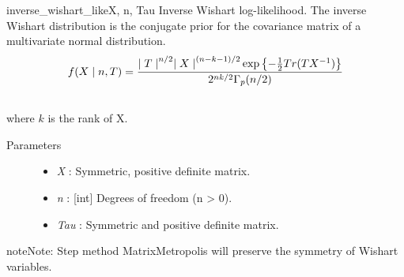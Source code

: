 \hypertarget{pymc.distributions.inverse_wishart_like}{}\begin{funcdesc}{inverse\_wishart\_like}{X, n, Tau}
Inverse Wishart log-likelihood. The inverse Wishart distribution is the conjugate
prior for the covariance matrix of a multivariate normal distribution.
\begin{gather}
\begin{split}f(X \mid n, T) = \frac{{\mid T \mid}^{n/2}{\mid X \mid}^{(n-k-1)/2} \exp\left\{ -\frac{1}{2} Tr(TX^{-1}) \right\}}{2^{nk/2} \Gamma_p(n/2)}\end{split}\notag\\\begin{split}\end{split}\notag
\end{gather}
where $k$ is the rank of X.
\begin{description}
\item[Parameters] \leavevmode\begin{itemize}
\item {} 
\emph{X} : Symmetric, positive definite matrix.

\item {} 
\emph{n} : {[}int{]} Degrees of freedom (n \textgreater{} 0).

\item {} 
\emph{Tau} : Symmetric and positive definite matrix.

\end{itemize}

\end{description}

\begin{notice}{note}{Note:}
Step method MatrixMetropolis will preserve the symmetry of Wishart variables.
\end{notice}
\end{funcdesc}

